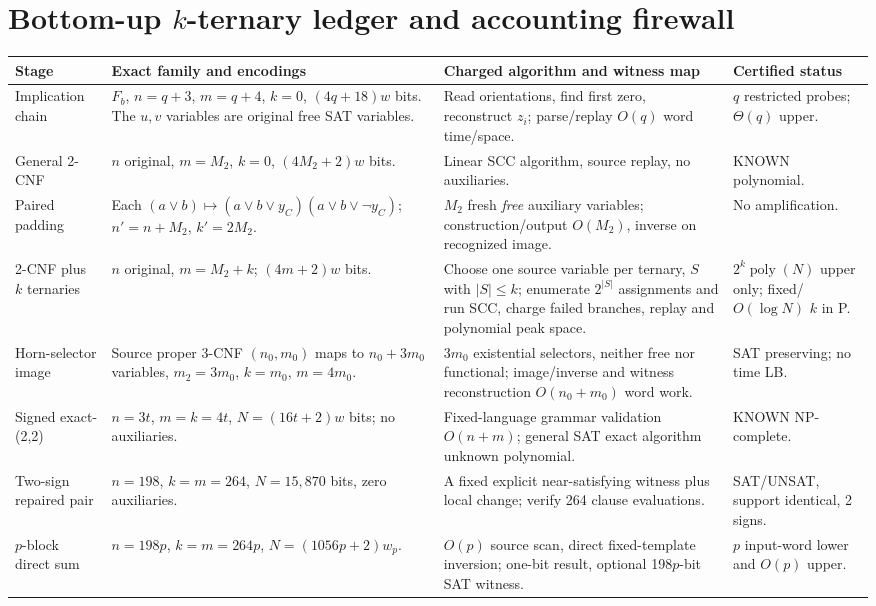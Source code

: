 \documentclass[11pt]{article}
\begin{document}
\section{Bottom-up $k$-ternary ledger and accounting firewall}
\small
\begin{longtable}{p{.20\linewidth}p{.29\linewidth}p{.25\linewidth}p{.18\linewidth}}
\toprule Stage & Exact family and encodings & Charged algorithm and witness map & Certified status\\\midrule\endhead
Implication chain & $F_b$, $n=q+3$, $m=q+4$, $k=0$, $(4q+18)w$ bits. The $u,v$ variables are original free SAT variables. & Read orientations, find first zero, reconstruct $z_i$; parse/replay $O(q)$ word time/space. & $q$ restricted probes; $\Theta(q)$ upper.\\
General 2-CNF & $n$ original, $m=M_2$, $k=0$, $(4M_2+2)w$ bits. & Linear SCC algorithm, source replay, no auxiliaries. & KNOWN polynomial.\\
Paired padding & Each $(a\vee b)\mapsto(a\vee b\vee y_C)(a\vee b\vee\neg y_C)$; $n'=n+M_2$, $k'=2M_2$. & $M_2$ fresh \emph{free} auxiliary variables; construction/output $O(M_2)$, inverse on recognized image. & No amplification.\\
2-CNF plus $k$ ternaries & $n$ original, $m=M_2+k$; $(4m+2)w$ bits. & Choose one source variable per ternary, $S$ with $|S|\le k$; enumerate $2^{|S|}$ assignments and run SCC, charge failed branches, replay and polynomial peak space. & $2^k\operatorname{poly}(N)$ upper only; fixed/$O(\log N)$ $k$ in P.\\
Horn-selector image & Source proper 3-CNF $(n_0,m_0)$ maps to $n_0+3m_0$ variables, $m_2=3m_0$, $k=m_0$, $m=4m_0$. & $3m_0$ existential selectors, neither free nor functional; image/inverse and witness reconstruction $O(n_0+m_0)$ word work. & SAT preserving; no time LB.\\
Signed exact-(2,2) & $n=3t$, $m=k=4t$, $N=(16t+2)w$ bits; no auxiliaries. & Fixed-language grammar validation $O(n+m)$; general SAT exact algorithm unknown polynomial. & KNOWN NP-complete.\\
Two-sign repaired pair & $n=198$, $k=m=264$, $N=15{,}870$ bits, zero auxiliaries. & A fixed explicit near-satisfying witness plus local change; verify 264 clause evaluations. & SAT/UNSAT, support identical, 2 signs.\\
$p$-block direct sum & $n=198p$, $k=m=264p$, $N=(1056p+2)w_p$. & $O(p)$ source scan, direct fixed-template inversion; one-bit result, optional 198$p$-bit SAT witness. & $p$ input-word lower and $O(p)$ upper.\\
\bottomrule
\end{longtable}
\end{document}
